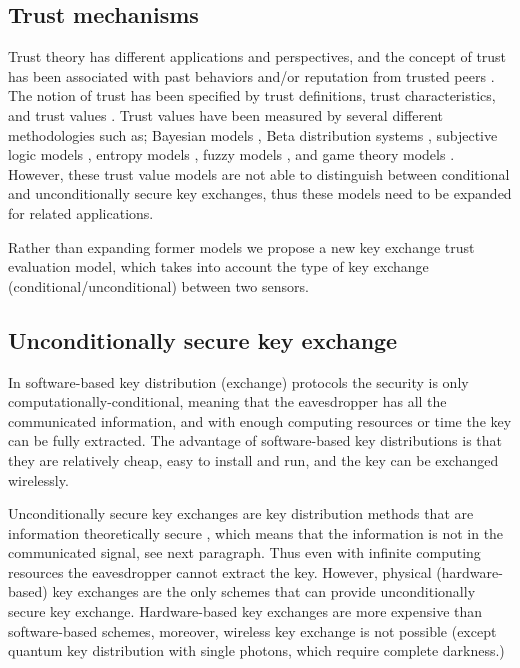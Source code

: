 \documentclass{ws-fnl2}
\begin{document}
\subsection{Trust mechanisms}

Trust theory has different applications and perspectives, and the concept of trust has been associated with past behaviors and/or reputation from trusted peers \cite{trust1, trust2, trust3, trust4, trust5, trust6}. The notion of trust has been specified by trust definitions, trust characteristics, and trust values \cite{trust7}. Trust values have been measured by several different methodologies such as; Bayesian models \cite{bayesian}, Beta distribution systems \cite{beta}, subjective logic models \cite{subjective}, entropy models \cite{entropy}, fuzzy models \cite{fuzzy}, and game theory models \cite{gametheory}. However, these trust value models are not able to distinguish between conditional and unconditionally secure key exchanges, thus these models need to be expanded for related applications.

Rather than expanding former models we propose a new key exchange trust evaluation model, which takes into account the type of key exchange (conditional/unconditional) between two sensors.



\subsection{Unconditionally secure key exchange}

In software-based key distribution (exchange) protocols the security is only computationally-conditional, meaning that the eavesdropper has all the communicated information, and with enough computing resources or time the key can be fully extracted. The advantage of software-based key distributions is that they are relatively cheap, easy to install and run, and the key can be exchanged wirelessly. 

Unconditionally secure key exchanges are key distribution methods that are information theoretically secure \cite{infotheosec}, which means that the information is not in the communicated signal, see next paragraph. Thus even with infinite computing resources the eavesdropper cannot extract the key. However, physical (hardware-based) key exchanges are the only schemes that can provide unconditionally secure key exchange. Hardware-based key exchanges are more expensive than software-based schemes, moreover, wireless key exchange is not possible (except quantum key distribution with single photons, which require complete darkness.)
\end{document}
